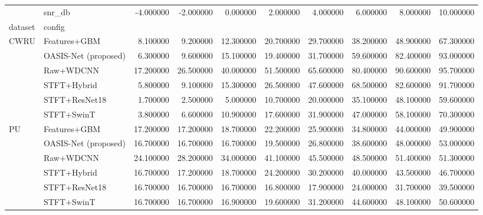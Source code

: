 \begin{tabular}{llrrrrrrrr}
\toprule
 & snr_db & -4.000000 & -2.000000 & 0.000000 & 2.000000 & 4.000000 & 6.000000 & 8.000000 & 10.000000 \\
dataset & config &  &  &  &  &  &  &  &  \\
\midrule
\multirow[t]{6}{*}{CWRU} & Features+GBM & 8.100000 & 9.200000 & 12.300000 & 20.700000 & 29.700000 & 38.200000 & 48.900000 & 67.300000 \\
 & OASIS-Net (proposed) & 6.300000 & 9.600000 & 15.100000 & 19.400000 & 31.700000 & 59.600000 & 82.400000 & 93.000000 \\
 & Raw+WDCNN & 17.200000 & 26.500000 & 40.000000 & 51.500000 & 65.600000 & 80.400000 & 90.600000 & 95.700000 \\
 & STFT+Hybrid & 5.800000 & 9.100000 & 15.300000 & 26.500000 & 47.600000 & 68.500000 & 82.600000 & 91.700000 \\
 & STFT+ResNet18 & 1.700000 & 2.500000 & 5.000000 & 10.700000 & 20.000000 & 35.100000 & 48.100000 & 59.600000 \\
 & STFT+SwinT & 3.800000 & 6.600000 & 10.900000 & 17.600000 & 31.900000 & 47.000000 & 58.100000 & 70.300000 \\
\cline{1-10}
\multirow[t]{6}{*}{PU} & Features+GBM & 17.200000 & 17.200000 & 18.700000 & 22.200000 & 25.900000 & 34.800000 & 44.000000 & 49.900000 \\
 & OASIS-Net (proposed) & 16.700000 & 16.700000 & 16.700000 & 19.500000 & 26.800000 & 38.600000 & 48.000000 & 53.000000 \\
 & Raw+WDCNN & 24.100000 & 28.200000 & 34.000000 & 41.100000 & 45.500000 & 48.500000 & 51.400000 & 51.300000 \\
 & STFT+Hybrid & 16.700000 & 17.200000 & 18.700000 & 24.200000 & 30.200000 & 40.000000 & 43.500000 & 46.700000 \\
 & STFT+ResNet18 & 16.700000 & 16.700000 & 16.700000 & 16.800000 & 17.900000 & 24.000000 & 31.700000 & 39.500000 \\
 & STFT+SwinT & 16.700000 & 16.700000 & 16.900000 & 19.600000 & 31.200000 & 44.600000 & 48.100000 & 50.600000 \\
\cline{1-10}
\bottomrule
\end{tabular}
